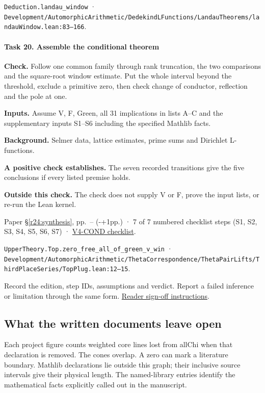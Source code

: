 \nolinkurl{Deduction.landau_window} · \nolinkurl{Development/AutomorphicArithmetic/DedekindLFunctions/LandauTheorems/landauWindow.lean:83–166}.

\paragraph{Task 20. Assemble the conditional theorem}\label{v7:task-20}

\textbf{Check.} Follow one common family through rank truncation, the two comparisons and the square-root window estimate. Put the whole interval beyond the threshold, exclude a primitive zero, then check change of conductor, reflection and the pole at one.

\textbf{Inputs.} Assume V, F, Green, all 31 implications in lists A–C and the supplementary inputs S1–S6 including the specified Mathlib facts.

\textbf{Background.} Selmer data, lattice estimates, prime sums and Dirichlet L-functions.

\textbf{A positive check establishes.} The seven recorded transitions give the five conclusions if every listed premise holds.

\textbf{Outside this check.} The check does not supply V or F, prove the input lists, or re-run the Lean kernel.

Paper \S\ref{r24:synthesis}, pp.\ \pageref{r24:synthesis}--\pageref{v5:conclusion-end} (\number\numexpr{}-+1\relax pp.) · 7 of 7 numbered checklist steps (S1, S2, S3, S4, S5, S6, S7) · \href{https://github.com/GunheeC/rh-lean-verification-atlas/blob/v0.1.0/units/V4-COND.check.md}{V4-COND checklist}.

\nolinkurl{UpperTheory.Top.zero_free_all_of_green_v_win} · \nolinkurl{Development/AutomorphicArithmetic/ThetaCorrespondence/ThetaPairLifts/ThirdPlaceSeries/TopPlug.lean:12–15}.

Record the edition, step IDs, assumptions and verdict. Report a failed inference or limitation through the same form. \href{https://github.com/GunheeC/rh-lean-verification-atlas/blob/v0.1.0/signoffs/README.md}{Reader sign-off instructions}.

\subsection{What the written documents leave open}\label{v7:q3}

Each project figure counts weighted core lines lost from allChi when that declaration is removed. The cones overlap. A zero can mark a literature boundary. Mathlib declarations lie outside this graph; their inclusive source intervals give their physical length. The named-library entries identify the mathematical facts explicitly called out in the manuscript.


